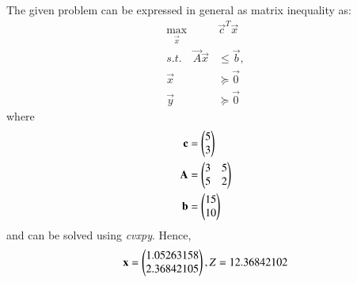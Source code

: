 The given problem can be expressed in general as matrix inequality as:
\begin{align}
\max_{\vec{x}} &\vec{c}^{T}\vec{x}
\\
s.t. \quad \vec{A}\vec{x} &\le \vec{b},
\\
\vec{x} &\succeq\vec{0}\\
\vec{y} &\succeq \vec{0}
\end{align}
%
where
\begin{align}
\vec{c} &= \myvec{5 \\ 3}
\\
\vec{A} &=
\myvec{
3 & 5
\\
5 & 2
}
\\
\vec{b}&=\myvec{15\\10}
%
\end{align}
%
and can be solved using {\em cvxpy}. 
Hence,
\begin{align}
\mathbf{x} = \begin{pmatrix}1.05263158\\2.36842105\end{pmatrix}, Z = 12.36842102
\end{align}

